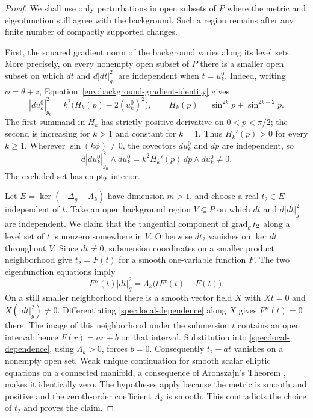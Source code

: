 \begin{proof}
We shall use only perturbations in open subsets of $P$ where the metric
and eigenfunction still agree with the background.  Such a region remains
after any finite number of compactly supported changes.

First, the squared gradient norm of the background varies along its level sets.
More precisely, on every nonempty open subset of $P$ there is a smaller
open subset on which $dt$ and $d|dt|_{g_0}^2$ are independent when
$t=u_k^0$.  Indeed, writing $\phi=\theta+z$, Equation~\eqref{env:background-gradient-identity} gives
\[
 |du_k^0|_{g_0}^2
 =k^2\bigl(H_k(p)-2(u_k^0)^2\bigr),\qquad
 H_k(p)=\sin^{2k}p+\sin^{2k-2}p.
\]
The first summand in $H_k$ has strictly positive derivative on
$0<p<\pi/2$; the second is increasing for $k>1$ and constant for
$k=1$.  Thus $H_k'(p)>0$ for every $k\ge1$.  Wherever
$\sin(k\phi)\ne0$, the covectors $du_k^0$ and $dp$ are independent, so
\[
 d|du_k^0|_{g_0}^2\wedge du_k^0
 =k^2 H_k'(p)\,dp\wedge du_k^0\ne0.
\]
The excluded set has empty interior.

Let $E=\ker(-\Delta_g-\Lambda_k)$ have dimension $m>1$, and choose a
real $t_2\in E$ independent of $t$.  Take an open background region
$V\Subset P$ on which $dt$ and $d|dt|_g^2$ are independent.  We claim
that the tangential component of $\operatorname{grad}_g t_2$ along a level set of $t$
is nonzero somewhere in $V$.  Otherwise $dt_2$ vanishes on $\ker dt$
throughout $V$.  Since $dt\ne0$, submersion coordinates on a smaller
product neighborhood give $t_2=F(t)$ for a smooth one-variable function
$F$.  The two eigenfunction equations imply
\begin{equation}
 F''(t)|dt|_g^2=\Lambda_k\bigl(tF'(t)-F(t)\bigr).
 \label{spec:local-dependence}
\end{equation}
On a still smaller neighborhood there is a smooth vector field $X$ with
$Xt=0$ and $X(|dt|_g^2)\ne0$.  Differentiating
\eqref{spec:local-dependence} along $X$ gives $F''(t)=0$ there.
The image of this neighborhood under the submersion $t$ contains an
open interval; hence $F(r)=ar+b$ on that interval.  Substitution into
\eqref{spec:local-dependence}, using $\Lambda_k>0$, forces $b=0$.
Consequently $t_2-at$ vanishes on a nonempty open set.  Weak unique
continuation for smooth scalar elliptic equations on a connected
manifold, a consequence of Aronszajn's Theorem
\cite[pp.~235--236]{Aronszajn1957}, makes it identically zero.
The hypotheses apply because the metric is smooth and positive and the
zeroth-order coefficient $\Lambda_k$ is smooth.  This contradicts the
choice of $t_2$ and proves the claim.


\end{proof}

